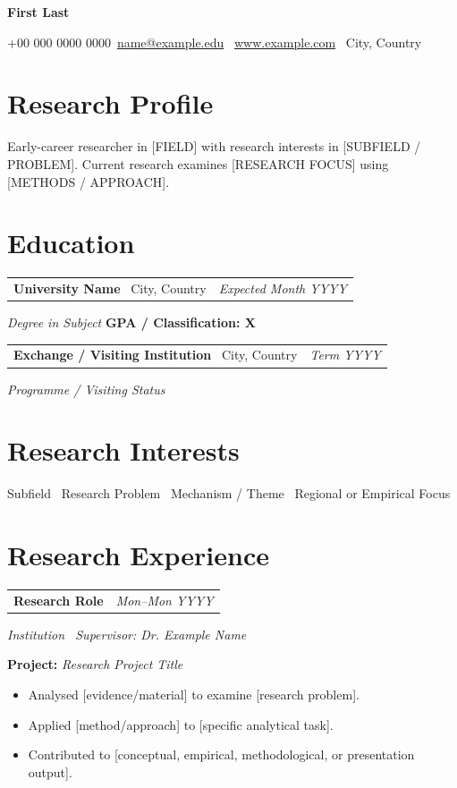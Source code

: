 \documentclass[10pt,a4paper]{article}
\makeatletter
\newcommand{\datedline}[2]{%
  \begin{tabularx}{\textwidth}{@{}Xr@{}}
    #1 & \textit{#2}
  \end{tabularx}%
}
\newcommand{\roleentry}[3]{%
  \datedline{{\fontsize{10.3pt}{11.2pt}\selectfont\textbf{#1}}}{#3}\vspace{1.25pt}
  \textit{#2}\par\vspace{1.25pt}
}
\newcommand{\projectline}[1]{%
  \textbf{Project:} \textit{#1}\par\vspace{1.5pt}
}
\newcommand{\cvname}{First Last}
\newcommand{\cvphone}{+00 000 0000 0000}
\newcommand{\cvemail}{name@example.edu}
\newcommand{\cvwebsite}{www.example.com}
\newcommand{\cvwebsiteurl}{https://www.example.com/}
\newcommand{\cvlocation}{City, Country}
\makeatother
\begin{document}
\fontsize{10.2pt}{11.3pt}\selectfont

\begin{center}
  {\fontsize{19pt}{20pt}\selectfont\bfseries \cvname}\par
  \vspace{3pt}
  {\fontsize{9.7pt}{10.4pt}\selectfont
  \cvphone \textbar\
  \href{mailto:\cvemail}{\cvemail} \textbar\
  \href{\cvwebsiteurl}{\cvwebsite} \textbar\ \cvlocation}
\end{center}
\vspace{-2pt}


\section{Research Profile}
Early-career researcher in [FIELD] with research interests in [SUBFIELD / PROBLEM]. Current research examines [RESEARCH FOCUS] using [METHODS / APPROACH].

\section{Education}
\datedline{\textbf{University Name} \textbar\ City, Country}{Expected Month YYYY}
\textit{Degree in Subject} \hfill \textbf{GPA / Classification: X}
\par\vspace{1.25pt}
\datedline{\textbf{Exchange / Visiting Institution} \textbar\ City, Country}{Term YYYY}
\textit{Programme / Visiting Status}\par

\section{Research Interests}
Subfield \textperiodcentered\ Research Problem \textperiodcentered\ Mechanism / Theme \textperiodcentered\ Regional or Empirical Focus

\section{Research Experience}
\roleentry
{Research Role}
{Institution \textbar\ Supervisor: Dr. Example Name}
{Mon--Mon YYYY}
\projectline{Research Project Title}
\begin{itemize}
    \item Analysed [evidence/material] to examine [research problem].
    \item Applied [method/approach] to [specific analytical task].
    \item Contributed to [conceptual, empirical, methodological, or presentation output].
\end{itemize}
\end{document}
